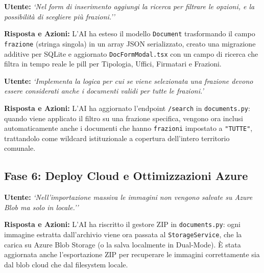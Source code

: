 \documentclass[12pt,a4paper,oneside]{report}
\begin{document}
\begin{promptbox}[title={Prompt 16 --- Barra di Ricerca nel Form e Selezione Multipla Frazioni}]
\textbf{Utente:} \textit{`Nel form di inserimento aggiungi la ricerca per filtrare le opzioni, e la possibilit\`{a} di scegliere pi\`{u} frazioni.''}

\textbf{Risposta e Azioni:} L'AI ha esteso il modello \texttt{Document} trasformando il campo \texttt{frazione} (stringa singola) in un array JSON serializzato, creato una migrazione additive per SQLite e aggiornato \texttt{DocFormModal.tsx} con un campo di ricerca che filtra in tempo reale le pill per Tipologia, Uffici, Firmatari e Frazioni.
\end{promptbox}

\begin{promptbox}[title={Prompt 17 --- Logica Wildcard ``Tutte le Frazioni''}]
\textbf{Utente:} \textit{`Implementa la logica per cui se viene selezionata una frazione devono essere considerati anche i documenti validi per tutte le frazioni.'}

\textbf{Risposta e Azioni:} L'AI ha aggiornato l'endpoint \texttt{/search} in \texttt{documents.py}: quando viene applicato il filtro su una frazione specifica, vengono ora inclusi automaticamente anche i documenti che hanno \texttt{frazioni} impostato a \texttt{"TUTTE"}, trattandolo come wildcard istituzionale a copertura dell'intero territorio comunale.
\end{promptbox}

\subsection{Fase 6: Deploy Cloud e Ottimizzazioni Azure}

\begin{promptbox}[title={Prompt 18 --- Storage Blob per Importazione Massiva}]
\textbf{Utente:} \textit{`Nell'importazione massiva le immagini non vengono salvate su Azure Blob ma solo in locale.''}

\textbf{Risposta e Azioni:} L'AI ha riscritto il gestore ZIP in \texttt{documents.py}: ogni immagine estratta dall'archivio viene ora passata al \texttt{StorageService}, che la carica su Azure Blob Storage (o la salva localmente in Dual-Mode). \`{E} stata aggiornata anche l'esportazione ZIP per recuperare le immagini correttamente sia dal blob cloud che dal filesystem locale.
\end{promptbox}
\end{document}
